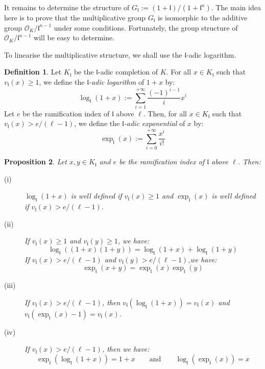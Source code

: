 \documentclass[a4paper,10pt]{report}
\theoremstyle{definition}
\newtheorem{definition}{Definition}[chapter]
\theoremstyle{plain}
\newtheorem{proposition}[definition]{Proposition}
\theoremstyle{definition}
\newcommand{\mO}{\mathcal{O}}
\renewcommand{\(}{\left(}
\renewcommand{\)}{\right)}
\newcommand{\mf}[1]{\mathfrak{#1}}
\begin{document}
It remains to determine the structure of $G_{\mf{l}}:=(1+\mf{l})/(1+\mf{l}^n)$. The main idea here is to prove that the multiplicative group $G_{\mf{l}}$ is isomorphic to the additive group $\mO_K/\mf{l}^{n-1}$ under some conditions.  Fortunately, the group structure of $\mO_K/\mf{l}^{n-1}$ will be easy to determine. 

To linearise the multiplicative structure, we shall use the $\mf{l}$-adic logarithm.

\begin{definition}
Let $K_{\mf{l}}$ be the $\mf{l}$-adic completion of $K$. For all $x\in K_{\mf{l}}$ such that $v_{\mf{l}}(x)\geq 1$, we define the \emph{$\mf{l}$-adic logarithm} of $1+x$ by:
\[\log_{\mf{l}}(1+x):=\sum_{i=1}^{+\infty} \frac{(-1)^{i-1}}{i}x^i\]
Let $e$ be the ramification index of $\mf{l}$ above $\ell$. Then, for all $x\in K_{\mf{l}}$ such that $v_{\mf{l}}(x)>e/(\ell-1)$, we define the \emph{$\mf{l}$-adic exponential} of $x$ by:
\[\exp_{\mf{l}}(x):=\sum_{i=0}^{+\infty}\frac{x^i}{i!}\]
\end{definition}

\begin{proposition}
Let $x, y\in K_{\mf{l}}$ and $e$ be the ramification index of $\mf{l}$ above $\ell$. Then:

\begin{description}
\item[(i)] $\log_{\mf{l}}(1+x)$ is well defined if $v_{\mf{l}}(x)\geq 1$ and $\exp_{\mf{l}}(x)$ is well defined if $v_{\mf{l}}(x)>e/(\ell-1)$.
\item[(ii)] If $v_{\mf{l}}(x)\geq 1$ and $v_{\mf{l}}(y)\geq 1$, we have:
\[\log_{\mf{l}}((1+x)(1+y))=\log_{\mf{l}}(1+x)+\log_{\mf{l}}(1+y)\]
If $v_{\mf{l}}(x)> e/(\ell-1)$ and $v_{\mf{l}}(y)>e/(\ell-1)$,we have:
\[\exp_{\mf{l}}(x+y)=\exp_{\mf{l}}(x)\exp_{\mf{l}}(y)\]
\item[(iii)] If $v_{\mf{l}}(x)>e/(\ell-1)$, then $v_{\mf{l}}(\log_{\mf{l}}(1+x))=v_{\mf{l}}(x)$ and $v_{\mf{l}}(\exp_{\mf{l}}(x)-1)=v_{\mf{l}}(x)$.
\item[(iv)] If $v_{\mf{l}}(x)> e/(\ell-1)$, then we have:
\[\exp_{\mf{l}}(\log_{\mf{l}}(1+x))=1+x \qquad \mbox{and} \qquad \log_{\mf{l}}(\exp_{\mf{l}}(x))=x\]
\end{description}
\end{proposition}
\end{document}
